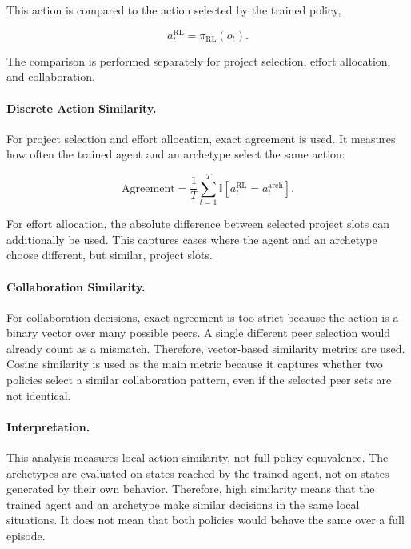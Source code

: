 \documentclass[english,bachelor]{hsluthesis}
\begin{document}
This action is compared to the action selected by the trained policy,

\begin{equation}
a^{\text{RL}}_t = \pi_{\text{RL}}(o_t).
\end{equation}

The comparison is performed separately for project selection, effort allocation, and collaboration.

\paragraph{Discrete Action Similarity.}
For project selection and effort allocation, exact agreement is used. It measures how often the trained agent and an archetype select the same action:

\begin{equation}
\text{Agreement} =
\frac{1}{T}
\sum_{t=1}^{T}
\mathbb{I}
\left[
a^{\text{RL}}_t = a^{\text{arch}}_t
\right].
\end{equation}

For effort allocation, the absolute difference between selected project slots can additionally be used. This captures cases where the agent and an archetype choose different, but similar, project slots.

\paragraph{Collaboration Similarity.}
For collaboration decisions, exact agreement is too strict because the action is a binary vector over many possible peers. A single different peer selection would already count as a mismatch. Therefore, vector-based similarity metrics are used. Cosine similarity is used as the main metric because it captures whether two policies select a similar collaboration pattern, even if the selected peer sets are not identical.

\paragraph{Interpretation.}
This analysis measures local action similarity, not full policy equivalence. The archetypes are evaluated on states reached by the trained agent, not on states generated by their own behavior. Therefore, high similarity means that the trained agent and an archetype make similar decisions in the same local situations. It does not mean that both policies would behave the same over a full episode.
\end{document}
